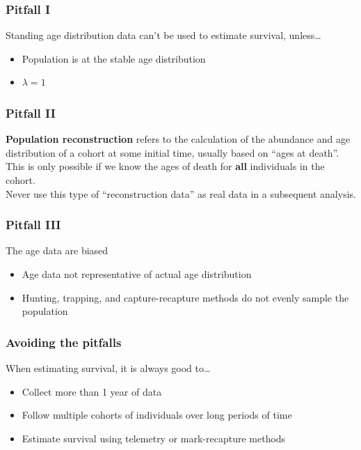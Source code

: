 \documentclass[color=usenames,dvipsnames]{beamer}\usepackage[]{graphicx}\usepackage[]{color}
\begin{document}
\begin{frame}
  \frametitle{Pitfall I}
  \large
  Standing age distribution data can't be used to estimate
    survival, unless\dots \\
  \begin{itemize}
    \item Population is at the stable age distribution
    \item $\lambda = 1$
  \end{itemize}
\end{frame}



\begin{frame}
  \frametitle{Pitfall II}
  \large
  {\bf Population reconstruction} refers to the calculation of the abundance
  and age distribution of a cohort at some initial time, usually based
  on ``ages at death''. \\
  \pause
  \vspace{0.5cm}
  This is only possible if we know the ages of death for \alert{\bf all}
  individuals in the cohort. \\
  \pause
  \vspace{0.5cm}
  Never use this type of ``reconstruction data'' as real data in a
  subsequent analysis.
\end{frame}




\begin{frame}
  \frametitle{Pitfall III}
  {\large %
    The age data are biased \\}
  \large
  \begin{itemize}
    \normalsize
    \item Age data not representative of actual age distribution
    \item Hunting, trapping, and capture-recapture methods do not
      evenly sample the population
  \end{itemize}
\end{frame}





\begin{frame}
  \frametitle{Avoiding the pitfalls}
  \large
    When estimating survival, it is always good to\dots \\
  \begin{itemize}
    \normalsize
    \item Collect more than 1 year of data
    \item Follow multiple cohorts of individuals over long periods of time
    \item Estimate survival using telemetry or mark-recapture methods
  \end{itemize}
\end{frame}
\end{document}
